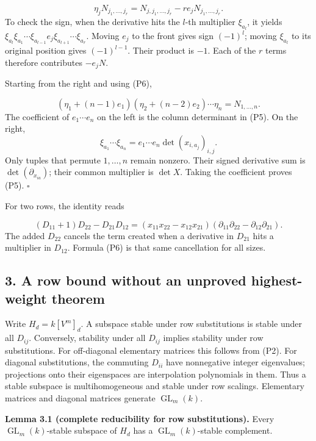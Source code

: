 \documentclass[
]{article}
\begin{document}
\[
\eta_jN_{j_1,\ldots,j_r}
=N_{j,j_1,\ldots,j_r}-r e_jN_{j_1,\ldots,j_r}.
\tag{P6}
\] To check the sign, when the derivative hits the \(l\)-th multiplier
\(\xi_{a_l}\), it yields \(\xi_{a_l}\xi_{a_1}\cdots\xi_{a_{l-1}}e_j
\xi_{a_{l+1}}\cdots\xi_{a_r}\). Moving \(e_j\) to the front gives sign
\((-1)^l\); moving \(\xi_{a_l}\) to its original position gives
\((-1)^{l-1}\). Their product is \(-1\). Each of the \(r\) terms
therefore contributes \(-e_jN\).

Starting from the right and using (P6),
\protect{}\label{equation-P7}{}

\[
(\eta_1+(n-1)e_1)(\eta_2+(n-2)e_2)\cdots\eta_n
=N_{1,\ldots,n}.
\tag{P7}
\] The coefficient of \(e_1\cdots e_n\) on the left is the column
determinant in (P5). On the right, \[
\xi_{a_1}\cdots\xi_{a_n}
=e_1\cdots e_n\det(x_{i,a_j})_{i,j}.
\] Only tuples that permute \(1,\ldots,n\) remain nonzero. Their signed
derivative sum is \(\det(\partial_{x_{ia}})\); their common multiplier
is \(\det X\). Taking the coefficient proves (P5). \(\square\)

For two rows, the identity reads
\protect{}\label{equation-P8}{}

\[
(D_{11}+1)D_{22}-D_{21}D_{12}
=(x_{11}x_{22}-x_{12}x_{21})
(\partial_{11}\partial_{22}-\partial_{12}\partial_{21}).
\tag{P8}
\] The added \(D_{22}\) cancels the term created when a derivative in
\(D_{21}\) hits a multiplier in \(D_{12}\). Formula (P6) is that same
cancellation for all sizes.

\subsection{3. A row bound without an unproved highest-weight
theorem}\label{section-3}

Write \(H_d=k [V^m]_d\). A subspace stable under row substitutions is
stable under all \(D_{ij}\). Conversely, stability under all \(D_{ij}\)
implies stability under row substitutions. For off-diagonal elementary
matrices this follows from (P2). For diagonal substitutions, the
commuting \(D_{ii}\) have nonnegative integer eigenvalues; projections
onto their eigenspaces are interpolation polynomials in them. Thus a
stable subspace is multihomogeneous and stable under row scalings.
Elementary matrices and diagonal matrices generate
\(\operatorname{GL}_m(k)\).

\protect{}\label{lemma-3-1}{}

\textbf{Lemma 3.1 (complete reducibility for row substitutions).} Every
\(\operatorname{GL}_m(k)\)-stable subspace of \(H_d\) has a
\(\operatorname{GL}_m(k)\)-stable complement.
\end{document}
